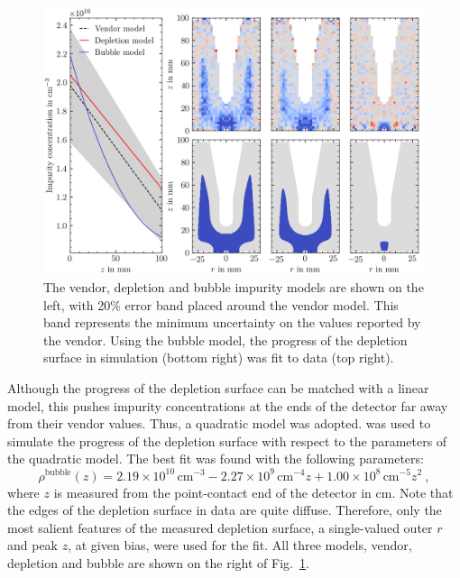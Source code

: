 \begin{figure}[htb]
    \centering
    \includegraphics[width=6in]{figs/sim/bubbles_impurities.png}
    \caption{The vendor, depletion and bubble impurity models are shown on the left, with 20\% error band placed around the vendor model. This band represents the minimum uncertainty on the values reported by the vendor. Using the bubble model, the progress of the depletion surface in simulation (bottom right) was fit to data (top right).}
    \label{fig:bubbles_impurities}
\end{figure}

Although the progress of the depletion surface can be matched with a linear model, this pushes impurity concentrations at the ends of the detector far away from their vendor values. Thus, a quadratic model was adopted. \SSD{} was used to simulate the progress of the depletion surface with respect to the parameters of the quadratic model. The best fit was found with the following parameters:
\begin{equation}
	\rho^\text{bubble}(z) = 2.19\times10^{10}\,\text{cm}^{-3} - 2.27\times10^9\,\text{cm}^{-4}z + 1.00\times10^8\,\text{cm}^{-5}z^2~,
\end{equation}
where $z$ is measured from the point-contact end of the detector in cm. Note that the edges of the depletion surface in data are quite diffuse. Therefore, only the most salient features of the measured depletion surface, a single-valued outer $r$ and peak $z$, at given bias, were used for the fit. All three models, vendor, depletion and bubble are shown on the right of Fig.~\ref{fig:bubbles_impurities}. 

